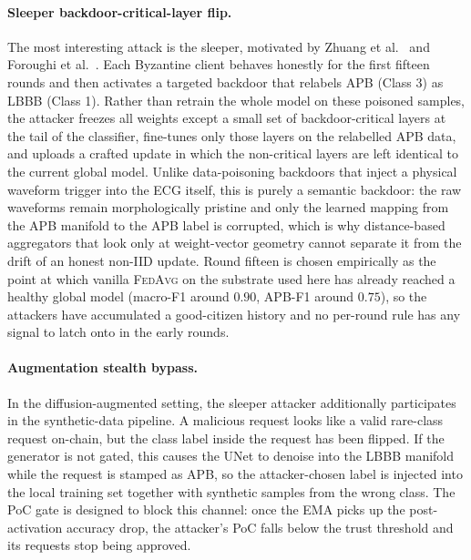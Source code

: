 \documentclass[runningheads]{llncs}
\newcommand{\fedavg}{\textsc{FedAvg}\xspace}
\begin{document}
\paragraph{Sleeper backdoor-critical-layer flip.}
The most interesting attack is the sleeper, motivated by Zhuang et
al.~\cite{zhuang2024bclayers} and Foroughi et
al.~\cite{foroughi2026lsa}. Each Byzantine client behaves honestly
for the first fifteen rounds and then activates a targeted backdoor
that relabels APB (Class 3) as LBBB (Class 1). Rather than retrain
the whole model on these poisoned samples, the attacker freezes all
weights except a small set of backdoor-critical layers at the tail of
the classifier, fine-tunes only those layers on the relabelled APB
data, and uploads a crafted update in which the non-critical layers
are left identical to the current global model. Unlike data-poisoning
backdoors that inject a physical waveform trigger into the ECG
itself, this is purely a semantic backdoor: the raw waveforms remain
morphologically pristine and only the learned mapping from the APB
manifold to the APB label is corrupted, which is why distance-based
aggregators that look only at weight-vector geometry cannot separate
it from the drift of an honest non-IID update. Round fifteen is
chosen empirically as the point at which vanilla \fedavg on the
substrate used here has already reached a healthy global model (macro-F1
around $0.90$, APB-F1 around $0.75$), so the attackers have
accumulated a good-citizen history and no per-round rule has any
signal to latch onto in the early rounds.

\paragraph{Augmentation stealth bypass.}
In the diffusion-augmented setting, the sleeper attacker
additionally participates in the synthetic-data pipeline. A
malicious request looks like a valid rare-class request on-chain,
but the class label inside the request has been flipped. If the
generator is not gated, this causes the UNet to denoise into the
LBBB manifold while the request is stamped as APB, so the
attacker-chosen label is injected into the local training set
together with synthetic samples from the wrong class. The PoC gate
is designed to block this channel: once the EMA picks up the
post-activation accuracy drop, the attacker's PoC falls below the
trust threshold and its requests stop being approved.

\end{document}

